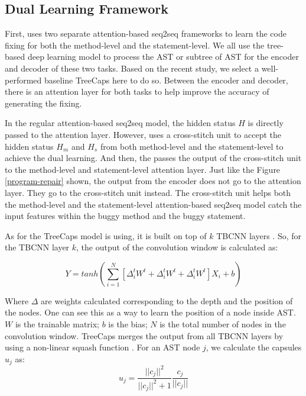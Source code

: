 \subsection{Dual Learning Framework}

First, \tool uses two separate attention-based seq2seq frameworks to learn the code fixing for both the method-level and the statement-level. We all use the tree-based deep learning model to process the AST or subtree of AST for the encoder and decoder of these two tasks. Based on the recent study, we select a well-performed baseline TreeCaps \cite{bui2021treecaps} here to do so. Between the encoder and decoder, there is an attention layer for both tasks to help improve the accuracy of generating the fixing.

In the regular attention-based seq2seq model, the hidden status $H$ is directly passed to the attention layer. However, \tool uses a cross-stitch unit to accept the hidden status $H_m$ and $H_s$ from both method-level and the statement-level to achieve the dual learning. And then, the \tool passes the output of the cross-stitch unit to the method-level and statement-level attention layer. Just like the Figure \ref{program-repair} shown, the output from the encoder does not go to the attention layer. They go to the cross-stitch unit instead. The cross-stitch unit helps both the method-level and the statement-level attention-based seq2seq model catch the input features within the buggy method and the buggy statement.

As for the TreeCaps model \tool is using, it is built on top of $k$ TBCNN layers \cite{mou2014tbcnn}. So, for the TBCNN layer $k$, the output of the convolution window is calculated as:

\begin{equation}\label{eq:1}
	Y = tanh(\sum_{i=1}^{N}[\Delta^t_iW^t + \Delta^t_iW^t + \Delta^t_iW^t]X_i + b)
\end{equation}

Where $\Delta$ are weights calculated corresponding to the depth and the position of the nodes. One can see this as a
way to learn the position of a node inside AST. $W$ is the trainable matrix; $b$ is the bias; $N$ is the total number of nodes in the convolution window. TreeCaps merges the output from all TBCNN layers by using a non-linear squash
function \cite{sabour2017dynamic}. For an AST node $j$, we calculate the capsules $u_j$ as:
\begin{equation}\label{eq:2}
	u_j = \frac{||c_j||^2}{||c_j||^2+1}\frac{c_j}{||c_j||}
\end{equation}


